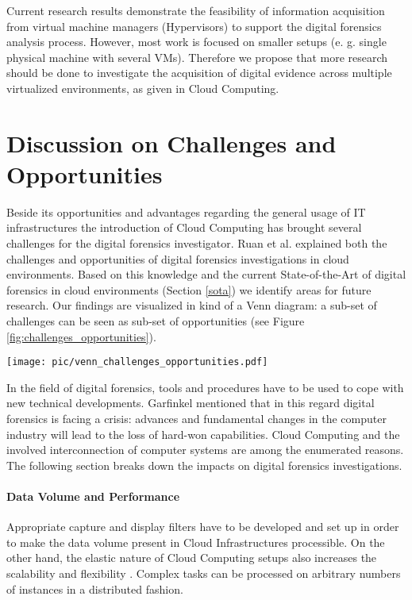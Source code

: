 \documentclass[runningheads,a4paper]{llncs}
\begin{document}
Current research results demonstrate the feasibility of information acquisition from virtual machine managers (Hypervisors) to support the digital forensics analysis process. However, most work is focused on smaller setups (e. g. single physical machine with several VMs). Therefore we propose that more research should be done to investigate the acquisition of digital evidence across multiple virtualized environments, as given in Cloud Computing.

\section{Discussion on Challenges and Opportunities}

Beside its opportunities and advantages regarding the general usage of IT infrastructures the introduction of Cloud Computing has brought several challenges for the digital forensics investigator. Ruan et al. \cite{Ruan2011,Ruan2011a} explained both the challenges and opportunities of digital forensics investigations in cloud environments. Based on this knowledge and the current State-of-the-Art of digital forensics in cloud environments (Section \ref{sota}) we identify areas for future research. Our findings are visualized in kind of a Venn diagram: a sub-set of challenges can be seen as sub-set of opportunities (see Figure \ref{fig:challenges_opportunities}). 

\begin{figure*}
\centerline{\texttt{[image: pic/venn\_challenges\_opportunities.pdf]}}
\caption{Challenges and Opportunities of Cloud Forensics}
\label{fig:challenges_opportunities}
\end{figure*}

In the field of digital forensics, tools and procedures have to be used to cope with new technical developments. Garfinkel \cite{Garfinkel2010} mentioned that in this regard digital forensics is facing a crisis: advances and fundamental changes in the computer industry will lead to the loss of hard-won capabilities. Cloud Computing and the involved interconnection of computer systems are among the enumerated reasons. The following section breaks down the impacts on digital forensics investigations. 

\paragraph{Data Volume and Performance} Appropriate capture and display filters have to be developed and set up in order to make the data volume present in Cloud Infrastructures processible. On the other hand, the elastic nature of Cloud Computing setups also increases the scalability and flexibility \cite{Ruan2011,Reilly2010}. Complex tasks can be processed on arbitrary numbers of instances in a distributed fashion. 
\end{document}
